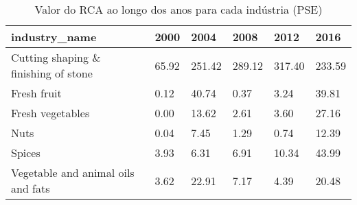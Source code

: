 \begin{table}
\centering
\caption{Valor do RCA ao longo dos anos para cada indústria (PSE)}
\begin{tabular}{p{6cm}p{1.5cm}p{1.5cm}p{1.5cm}p{1.5cm}p{1.5cm}}
\toprule
                       industry\_name &  2000 &   2004 &   2008 &   2012 &   2016 \\
\midrule
Cutting shaping \& finishing of stone & 65.92 & 251.42 & 289.12 & 317.40 & 233.59 \\
                         Fresh fruit &  0.12 &  40.74 &   0.37 &   3.24 &  39.81 \\
                    Fresh vegetables &  0.00 &  13.62 &   2.61 &   3.60 &  27.16 \\
                                Nuts &  0.04 &   7.45 &   1.29 &   0.74 &  12.39 \\
                              Spices &  3.93 &   6.31 &   6.91 &  10.34 &  43.99 \\
  Vegetable and animal oils and fats &  3.62 &  22.91 &   7.17 &   4.39 &  20.48 \\
\bottomrule
\end{tabular}
\end{table}
